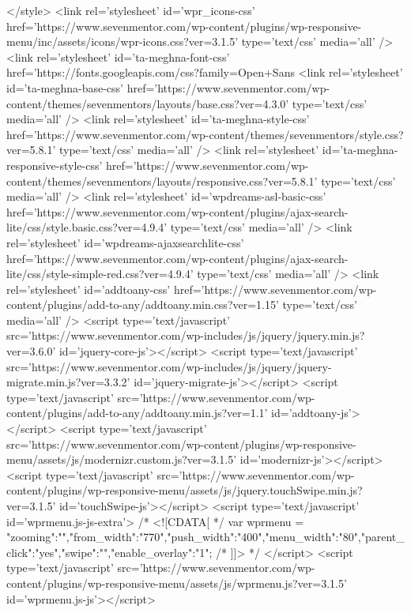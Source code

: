 {{</style>
<link rel='stylesheet' id='wpr_icons-css' href='https://www.sevenmentor.com/wp-content/plugins/wp-responsive-menu/inc/assets/icons/wpr-icons.css?ver=3.1.5' type='text/css' media='all' />
<link rel='stylesheet' id='ta-meghna-font-css' href='https://fonts.googleapis.com/css?family=Open+Sans%
<link rel='stylesheet' id='ta-meghna-base-css' href='https://www.sevenmentor.com/wp-content/themes/sevenmentors/layouts/base.css?ver=4.3.0' type='text/css' media='all' />
<link rel='stylesheet' id='ta-meghna-style-css' href='https://www.sevenmentor.com/wp-content/themes/sevenmentors/style.css?ver=5.8.1' type='text/css' media='all' />
<link rel='stylesheet' id='ta-meghna-responsive-style-css' href='https://www.sevenmentor.com/wp-content/themes/sevenmentors/layouts/responsive.css?ver=5.8.1' type='text/css' media='all' />
<link rel='stylesheet' id='wpdreams-asl-basic-css' href='https://www.sevenmentor.com/wp-content/plugins/ajax-search-lite/css/style.basic.css?ver=4.9.4' type='text/css' media='all' />
<link rel='stylesheet' id='wpdreams-ajaxsearchlite-css' href='https://www.sevenmentor.com/wp-content/plugins/ajax-search-lite/css/style-simple-red.css?ver=4.9.4' type='text/css' media='all' />
<link rel='stylesheet' id='addtoany-css' href='https://www.sevenmentor.com/wp-content/plugins/add-to-any/addtoany.min.css?ver=1.15' type='text/css' media='all' />
<script type='text/javascript' src='https://www.sevenmentor.com/wp-includes/js/jquery/jquery.min.js?ver=3.6.0' id='jquery-core-js'></script>
<script type='text/javascript' src='https://www.sevenmentor.com/wp-includes/js/jquery/jquery-migrate.min.js?ver=3.3.2' id='jquery-migrate-js'></script>
<script type='text/javascript' src='https://www.sevenmentor.com/wp-content/plugins/add-to-any/addtoany.min.js?ver=1.1' id='addtoany-js'></script>
<script type='text/javascript' src='https://www.sevenmentor.com/wp-content/plugins/wp-responsive-menu/assets/js/modernizr.custom.js?ver=3.1.5' id='modernizr-js'></script>
<script type='text/javascript' src='https://www.sevenmentor.com/wp-content/plugins/wp-responsive-menu/assets/js/jquery.touchSwipe.min.js?ver=3.1.5' id='touchSwipe-js'></script>
<script type='text/javascript' id='wprmenu.js-js-extra'>
/* <![CDATA[ */
var wprmenu = {"zooming":"","from_width":"770","push_width":"400","menu_width":"80","parent_click":"yes","swipe":"","enable_overlay":"1"};
/* ]]> */
</script>
<script type='text/javascript' src='https://www.sevenmentor.com/wp-content/plugins/wp-responsive-menu/assets/js/wprmenu.js?ver=3.1.5' id='wprmenu.js-js'></script>
}}
